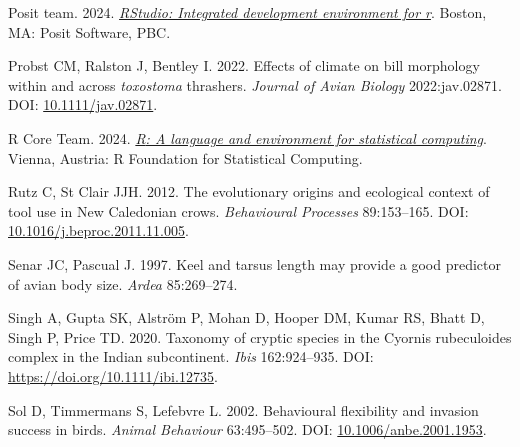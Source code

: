 \documentclass[10pt,a4paper]{article}
\newlength{\cslhangindent}
\newenvironment{CSLReferences}[2] %
 {\begin{list}{}{%
  \setlength{\itemindent}{0pt}
  \setlength{\leftmargin}{0pt}
  \setlength{\parsep}{0pt}
  \ifodd #1
   \setlength{\leftmargin}{\cslhangindent}
   \setlength{\itemindent}{-1\cslhangindent}
  \fi
  \setlength{\itemsep}{#2\baselineskip}}}
 {\end{list}}
\begin{document}
\begin{CSLReferences}{1}{0}
Posit team. 2024. \emph{\href{http://www.posit.co/}{{RStudio}: Integrated development environment for r}}. Boston, MA: Posit Software, PBC.

Probst CM, Ralston J, Bentley I. 2022. Effects of climate on bill morphology within and across \emph{toxostoma} thrashers. \emph{Journal of Avian Biology} 2022:jav.02871. DOI: \href{https://doi.org/10.1111/jav.02871}{10.1111/jav.02871}.

R Core Team. 2024. \emph{\href{https://www.R-project.org/}{{R}: A language and environment for statistical computing}}. Vienna, Austria: R Foundation for Statistical Computing.

Rutz C, St Clair JJH. 2012. The evolutionary origins and ecological context of tool use in {New} {Caledonian} crows. \emph{Behavioural Processes} 89:153--165. DOI: \href{https://doi.org/10.1016/j.beproc.2011.11.005}{10.1016/j.beproc.2011.11.005}.

Senar JC, Pascual J. 1997. Keel and tarsus length may provide a good predictor of avian body size. \emph{Ardea} 85:269--274.

Singh A, Gupta SK, Alström P, Mohan D, Hooper DM, Kumar RS, Bhatt D, Singh P, Price TD. 2020. Taxonomy of cryptic species in the {Cyornis} rubeculoides complex in the {Indian} subcontinent. \emph{Ibis} 162:924--935. DOI: \url{https://doi.org/10.1111/ibi.12735}.

Sol D, Timmermans S, Lefebvre L. 2002. Behavioural flexibility and invasion success in birds. \emph{Animal Behaviour} 63:495--502. DOI: \href{https://doi.org/10.1006/anbe.2001.1953}{10.1006/anbe.2001.1953}.


\end{CSLReferences}
\end{document}
